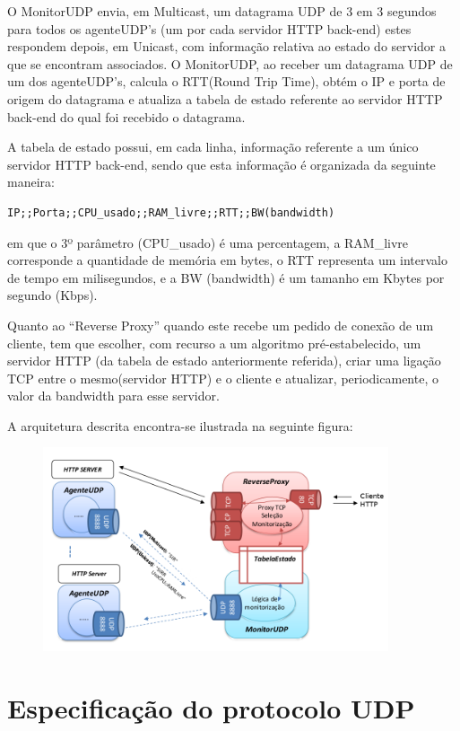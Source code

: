 \documentclass{article}
\begin{document}
O MonitorUDP envia, em Multicast, um datagrama UDP de 3 em 3 segundos para todos os agenteUDP's (um por cada servidor HTTP back-end) estes respondem depois, em Unicast, com informação relativa ao estado do servidor a que se encontram associados. O MonitorUDP, ao receber um datagrama UDP de um dos agenteUDP's, calcula o RTT(Round Trip Time), obtém o IP e porta de origem do datagrama e atualiza a tabela de estado referente ao servidor HTTP back-end do qual foi recebido o datagrama.

A tabela de estado possui, em cada linha, informação referente a um único servidor HTTP back-end, sendo que esta informação é organizada da seguinte maneira:

\begin{verbatim}
IP;;Porta;;CPU_usado;;RAM_livre;;RTT;;BW(bandwidth)
\end{verbatim}
em que o 3º parâmetro (CPU\_usado) é uma percentagem, a RAM\_livre corresponde a quantidade de memória em bytes, o RTT representa um intervalo de tempo em milisegundos, e a BW (bandwidth) é um tamanho em Kbytes por segundo (Kbps).

Quanto ao ``Reverse Proxy'' quando este recebe um pedido de conexão de um cliente, tem que escolher, com recurso a um algoritmo pré-estabelecido,  um servidor HTTP (da tabela de estado anteriormente referida), criar uma ligação TCP entre o mesmo(servidor HTTP) e o cliente e atualizar, periodicamente, o valor da bandwidth para esse servidor.

A arquitetura descrita encontra-se ilustrada na seguinte figura:
\begin{figure}[H]
	\centering
	\includegraphics[height=6cm]{arquitetura.png}
\end{figure}

\section{Especificação do protocolo UDP}
\end{document}
